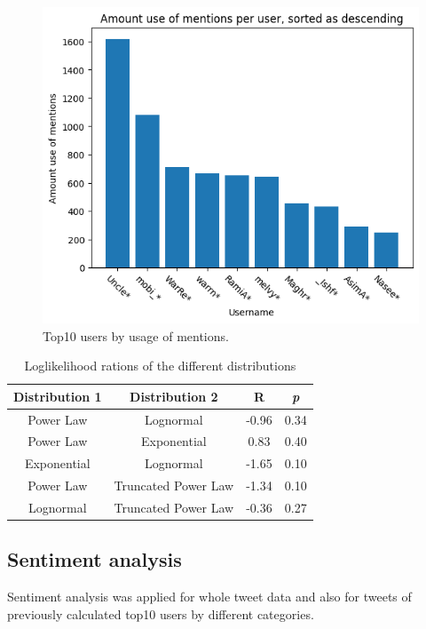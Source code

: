 \documentclass[conference]{IEEEtran}
\begin{document}
\begin{figure}
\includegraphics[scale=0.6]{figures/amount_mentions_user}
\caption{Top10 users by usage of mentions.}
\label{fig:amount-mentions-user}
\end{figure}
\begin{table}
    \begin{tabular}{ |c|c|c|c|}
        \hline
        Distribution 1 & Distribution 2 & R & \textit{p} \\
        \hline
        Power Law & Lognormal & -0.96 & 0.34 \\
        \hline
        Power Law & Exponential & 0.83 & 0.40 \\
        \hline
        Exponential & Lognormal & -1.65 & 0.10 \\
        \hline
        Power Law & Truncated Power Law & -1.34 & 0.10 \\
        \hline
        Lognormal & Truncated Power Law & -0.36 & 0.27 \\
        \hline
    \end{tabular}
    \caption{Loglikelihood rations of the different distributions}
    \label{tab:powerlaw}
\end{table}

\subsection{Sentiment analysis}
Sentiment analysis was applied for whole tweet data and also for tweets of previously calculated top10 users by different categories.
\end{document}
